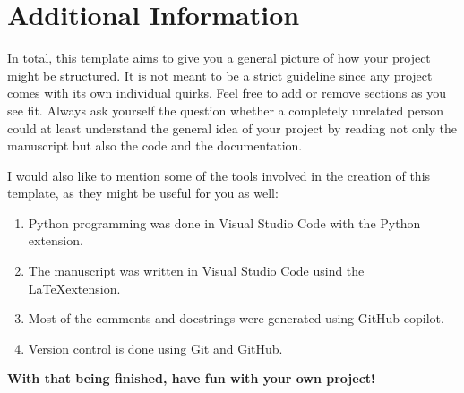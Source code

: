 \documentclass{article}
\begin{document}
\section*{Additional Information}

In total, this template aims to give you a general picture of how your project might be structured. It is not meant to be a strict guideline since any project comes with its own individual quirks. Feel free to add or remove sections as you see fit. Always ask yourself the question whether a completely unrelated person could at least understand the general idea of your project by reading not only the manuscript but also the code and the documentation.

I would also like to mention some of the tools involved in the creation of this template, as they might be useful for you as well:
\begin{enumerate}
    \item Python programming was done in Visual Studio Code with the Python extension.
    \item The manuscript was written in Visual Studio Code usind the \LaTeX extension.
    \item Most of the comments and docstrings were generated using GitHub copilot.
    \item Version control is done using Git and GitHub.
\end{enumerate}
\textbf{With that being finished, have fun with your own project!}
\end{document}
